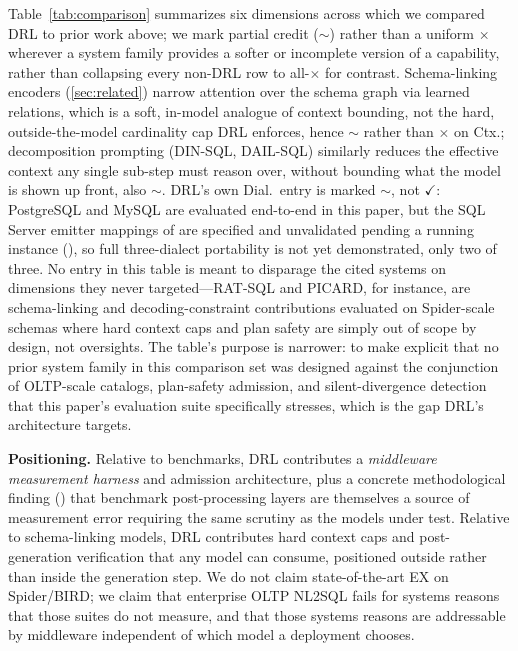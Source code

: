 \documentclass[twocolumn]{svjour3}
\begin{document}
Table~\ref{tab:comparison} summarizes six dimensions across which we compared DRL to prior work above; we mark partial credit ($\sim$) rather than a uniform $\times$ wherever a system family provides a softer or incomplete version of a capability, rather than collapsing every non-DRL row to all-$\times$ for contrast.
Schema-linking encoders (\cref{sec:related}) narrow attention over the schema graph via learned relations, which is a soft, in-model analogue of context bounding, not the hard, outside-the-model cardinality cap DRL enforces, hence $\sim$ rather than $\times$ on Ctx.; decomposition prompting (DIN-SQL, DAIL-SQL) similarly reduces the effective context any single sub-step must reason over, without bounding what the model is shown up front, also $\sim$.
DRL's own Dial.\ entry is marked $\sim$, not $\checkmark$: PostgreSQL and MySQL are evaluated end-to-end in this paper, but the SQL Server emitter mappings of  are specified and unvalidated pending a running instance (), so full three-dialect portability is not yet demonstrated, only two of three.
No entry in this table is meant to disparage the cited systems on dimensions they never targeted---RAT-SQL and PICARD, for instance, are schema-linking and decoding-constraint contributions evaluated on Spider-scale schemas where hard context caps and plan safety are simply out of scope by design, not oversights.
The table's purpose is narrower: to make explicit that no prior system family in this comparison set was designed against the conjunction of OLTP-scale catalogs, plan-safety admission, and silent-divergence detection that this paper's evaluation suite specifically stresses, which is the gap DRL's architecture targets.

\textbf{Positioning.}
Relative to benchmarks, DRL contributes a \emph{middleware measurement harness} and admission architecture, plus a concrete methodological finding () that benchmark post-processing layers are themselves a source of measurement error requiring the same scrutiny as the models under test.
Relative to schema-linking models, DRL contributes hard context caps and post-generation verification that any model can consume, positioned outside rather than inside the generation step.
We do not claim state-of-the-art EX on Spider/BIRD; we claim that enterprise OLTP NL2SQL fails for systems reasons that those suites do not measure, and that those systems reasons are addressable by middleware independent of which model a deployment chooses.
\end{document}
